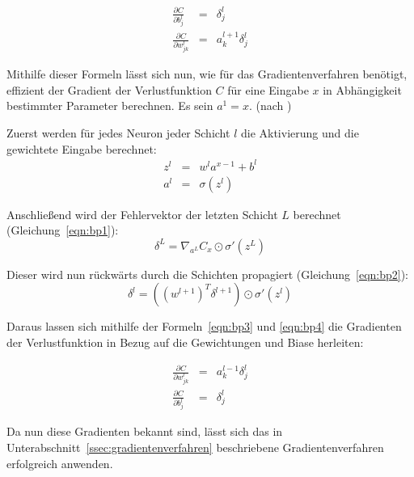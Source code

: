 \begin{eqnarray}
\label{eqn:bp3}
\frac{\partial C}{\partial b_j^l} &=& \delta_j^l\\
\label{eqn:bp4}
\frac{\partial C}{\partial w_{jk}^l} &=& a_k^{l+1}\delta_j^l
\end{eqnarray}

Mithilfe dieser Formeln lässt sich nun, wie für das Gradientenverfahren benötigt, effizient der Gradient der Verlustfunktion $C$ für eine Eingabe $x$ in Abhängigkeit bestimmter Parameter berechnen. Es sein $a^1=x$. (nach \cite[Kap.~2]{nielsen_15})

Zuerst werden für jedes Neuron jeder Schicht $l$ die Aktivierung und die gewichtete Eingabe berechnet:
\begin{eqnarray}
z^{l}&=& w^{l}a^{x-1}+b^l\\
a^{l}&=&\sigma\left(z^{l}\right)
\end{eqnarray}

Anschließend wird der Fehlervektor der letzten Schicht $L$ berechnet (\vgl Gleichung~\ref{eqn:bp1}):
\begin{equation}
\delta^{L}=\nabla_{a^L}C_x\odot\sigma'\left(z^{L}\right)
\end{equation}

Dieser wird nun rückwärts durch die Schichten propagiert (\vgl Gleichung~\ref{eqn:bp2}):
\begin{equation}
\delta^{l}=\left(\left(w^{l+1}\right)^T\delta^{l+1}\right)\odot\sigma'\left(z^{l}\right)
\end{equation}

Daraus lassen sich mithilfe der Formeln~\ref{eqn:bp3} und \ref{eqn:bp4} die Gradienten der Verlustfunktion in Bezug auf die Gewichtungen und Biase herleiten:

\begin{eqnarray}
\frac{\partial C}{\partial w_{jk}^l}&=&a_k^{l-1}\delta_j^l\\
\frac{\partial C}{\partial b_{j}^l}&=&\delta_j^l
\end{eqnarray}

Da nun diese Gradienten bekannt sind, lässt sich das in Unterabschnitt~\ref{ssec:gradientenverfahren} beschriebene Gradientenverfahren erfolgreich anwenden.
